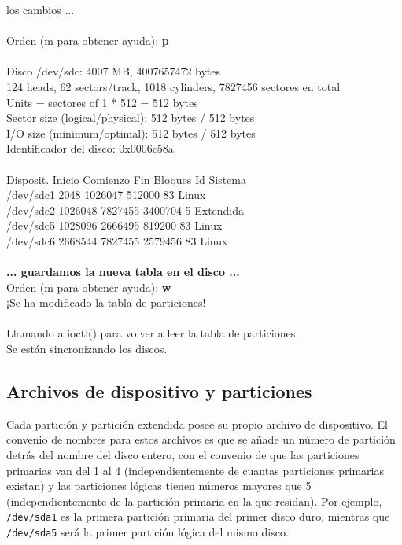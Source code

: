 \documentclass[12pt]{article}
\begin{document}
{{los cambios ...}\\
\\
Orden (m para obtener ayuda):  {\bf p}\\
\\
Disco /dev/sdc: 4007 MB, 4007657472 bytes\\
124 heads, 62 sectors/track, 1018 cylinders, 7827456 sectores en total\\
Units = sectores of 1 * 512 = 512 bytes\\
Sector size (logical/physical): 512 bytes / 512 bytes\\
I/O size (minimum/optimal): 512 bytes / 512 bytes\\
Identificador del disco: 0x0006c58a\\
\\
Disposit. Inicio    Comienzo      Fin      Bloques  Id  Sistema\\
/dev/sdc1            2048     1026047      512000   83  Linux\\
/dev/sdc2         1026048     7827455     3400704    5  Extendida\\
/dev/sdc5         1028096     2666495      819200   83  Linux\\
/dev/sdc6         2668544     7827455     2579456   83  Linux\\
\\
\textbf{... guardamos la nueva tabla en el disco  ...}\\
Orden (m para obtener ayuda): {\bf w}\\
¡Se ha modificado la tabla de particiones!\\
\\
Llamando a ioctl() para volver a leer la tabla de particiones.\\
Se están sincronizando los discos.\\
}

\subsection*{Archivos de dispositivo y particiones}

Cada partición y partición extendida posee su propio archivo de 
dispositivo. El convenio de nombres para estos archivos es que se añade 
un número de partición detrás del nombre del disco entero, con el 
convenio de que las particiones primarias van del 1 al 4 
(independientemente de cuantas particiones primarias existan) y las 
particiones lógicas tienen números mayores que 5 
(independientemente de la partición primaria en la que residan). Por 
ejemplo, \texttt{/dev/sda1} es la primera partición primaria del primer
disco duro, mientras que \texttt{/dev/sda5} será la primer partición 
lógica del mismo disco.
\end{document}
